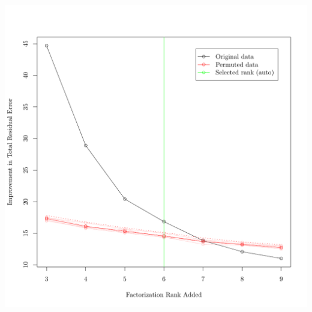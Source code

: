 \documentclass{article}
\begin{document}
\begin{knitrout}
{\centering \includegraphics[width=\maxwidth]{figure/nmf-rank-plots-2} 

}



\end{knitrout}
\end{document}
